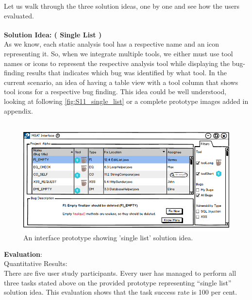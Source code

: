 Let us walk through the three solution ideas, one by one and see how the users evaluated. \\ \\

\textbf{Solution Idea: ( Single List )} \\

As we know, each static analysis tool has a respective name and an icon representing it. So, when we integrate multiple tools, we either must use tool names or icons to represent the respective analysis tool while displaying the bug-finding results that indicates which bug was identified by what tool. In the current scenario, an idea of having a table view with a tool column that shows tool icons for a respective bug finding. This idea could be well understood, looking at following \autoref{fig:S11_single_list} or a complete prototype images added in appendix. \\ \\

\clearpage

\begin{figure}[hbt!]
	\centering
	\includegraphics[width=\linewidth]{figures/solution_ideas_snaps/S11_single_list}
	\caption{An interface prototype showing 'single list' solution idea.}
	\label{fig:S11_single_list}
\end{figure}


\textbf{Evaluation}: \\

Quantitative Results: \\

There are five user study participants. Every user has managed to perform all three tasks stated above on the provided prototype representing “single list” solution idea. This evaluation shows that the task success rate is 100 per cent. \\ \\

